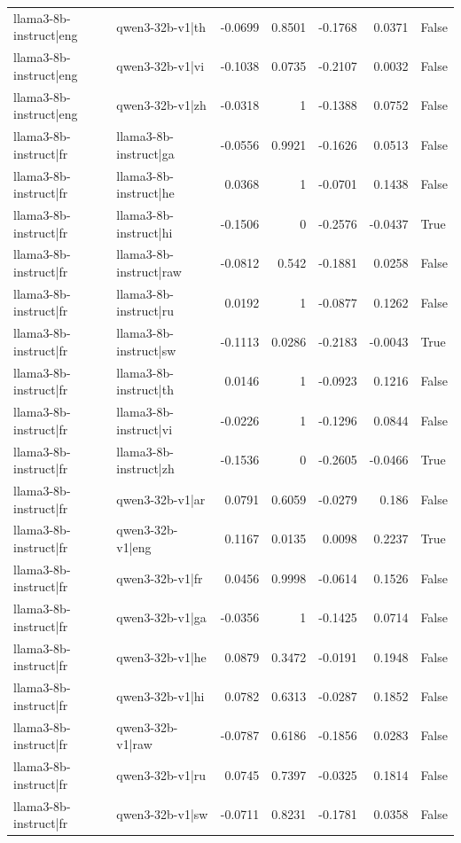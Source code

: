 \begin{table}
\begin{tabular}{l l r r r r l}
llama3-8b-instruct|eng & qwen3-32b-v1|th & -0.0699 & 0.8501 & -0.1768 & 0.0371 & False \\
llama3-8b-instruct|eng & qwen3-32b-v1|vi & -0.1038 & 0.0735 & -0.2107 & 0.0032 & False \\
llama3-8b-instruct|eng & qwen3-32b-v1|zh & -0.0318 & 1 & -0.1388 & 0.0752 & False \\
llama3-8b-instruct|fr & llama3-8b-instruct|ga & -0.0556 & 0.9921 & -0.1626 & 0.0513 & False \\
llama3-8b-instruct|fr & llama3-8b-instruct|he & 0.0368 & 1 & -0.0701 & 0.1438 & False \\
llama3-8b-instruct|fr & llama3-8b-instruct|hi & -0.1506 & 0 & -0.2576 & -0.0437 & True \\
llama3-8b-instruct|fr & llama3-8b-instruct|raw & -0.0812 & 0.542 & -0.1881 & 0.0258 & False \\
llama3-8b-instruct|fr & llama3-8b-instruct|ru & 0.0192 & 1 & -0.0877 & 0.1262 & False \\
llama3-8b-instruct|fr & llama3-8b-instruct|sw & -0.1113 & 0.0286 & -0.2183 & -0.0043 & True \\
llama3-8b-instruct|fr & llama3-8b-instruct|th & 0.0146 & 1 & -0.0923 & 0.1216 & False \\
llama3-8b-instruct|fr & llama3-8b-instruct|vi & -0.0226 & 1 & -0.1296 & 0.0844 & False \\
llama3-8b-instruct|fr & llama3-8b-instruct|zh & -0.1536 & 0 & -0.2605 & -0.0466 & True \\
llama3-8b-instruct|fr & qwen3-32b-v1|ar & 0.0791 & 0.6059 & -0.0279 & 0.186 & False \\
llama3-8b-instruct|fr & qwen3-32b-v1|eng & 0.1167 & 0.0135 & 0.0098 & 0.2237 & True \\
llama3-8b-instruct|fr & qwen3-32b-v1|fr & 0.0456 & 0.9998 & -0.0614 & 0.1526 & False \\
llama3-8b-instruct|fr & qwen3-32b-v1|ga & -0.0356 & 1 & -0.1425 & 0.0714 & False \\
llama3-8b-instruct|fr & qwen3-32b-v1|he & 0.0879 & 0.3472 & -0.0191 & 0.1948 & False \\
llama3-8b-instruct|fr & qwen3-32b-v1|hi & 0.0782 & 0.6313 & -0.0287 & 0.1852 & False \\
llama3-8b-instruct|fr & qwen3-32b-v1|raw & -0.0787 & 0.6186 & -0.1856 & 0.0283 & False \\
llama3-8b-instruct|fr & qwen3-32b-v1|ru & 0.0745 & 0.7397 & -0.0325 & 0.1814 & False \\
llama3-8b-instruct|fr & qwen3-32b-v1|sw & -0.0711 & 0.8231 & -0.1781 & 0.0358 & False \\

\end{tabular}
\end{table}
